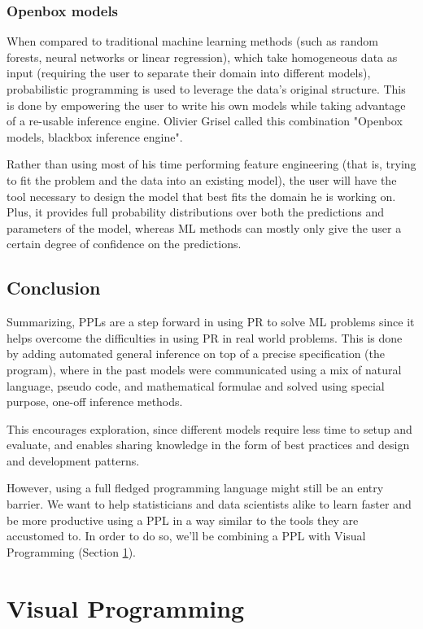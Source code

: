\subsubsection{Openbox models}

When compared to traditional machine learning methods (such as random forests, neural
networks or linear regression), which take homogeneous data as input (requiring
the user to separate their domain into different models), probabilistic
programming is used to leverage the data’s original structure. This is done by
empowering the user to write his own models while taking advantage of a re-usable
inference engine. Olivier Grisel called this combination "Openbox models,
blackbox inference engine"\cite{SciPy}.

Rather than using most of his
time performing feature engineering (that is, trying to fit the problem and the
data into an existing model), the user will have the tool necessary to design
the model that best fits the domain he is working on.
Plus, it provides full probability distributions over both the predictions and parameters of the
model, whereas ML methods can mostly only give the user a certain degree of confidence
on the predictions.

\subsection{Conclusion}

Summarizing, PPLs are a step forward in using PR to solve ML problems since
it helps overcome the difficulties in using PR in real world problems. This is
done by adding automated general inference on top of a precise specification
(the program), where in the past models were communicated
using a mix of natural language, pseudo code, and mathematical formulae and solved
using special purpose, one-off inference methods.

This encourages exploration, since
different models require less time to setup and evaluate, and enables sharing
knowledge in the form of best practices and design and development patterns.

However, using a full fledged programming language might still be an entry
barrier. We want to help statisticians and data scientists alike to learn
faster and be more productive using a PPL in a way similar to the tools they
are accustomed to. In order to do so, we'll be combining a PPL with Visual
Programming (Section \ref{sec:vp}).

\section{Visual Programming}
\label{sec:vp}


